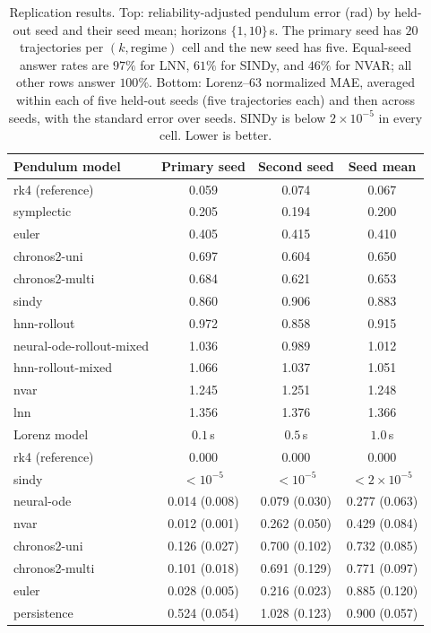 \documentclass{article}
\begin{document}
\begin{table}[htbp]
\centering\small
\caption{Replication results. Top: reliability-adjusted pendulum error (rad) by held-out
seed and their seed mean; horizons $\{1,10\}$\,s. The primary seed has $20$ trajectories per
$(k,\mathrm{regime})$ cell and the new seed has five. Equal-seed answer rates are $97\%$
for LNN, $61\%$ for SINDy, and $46\%$ for NVAR; all other rows answer $100\%$. Bottom:
Lorenz--63 normalized MAE, averaged within each of five held-out seeds (five trajectories each)
and then across seeds, with the standard error over seeds. SINDy is below $2\times10^{-5}$ in
every cell. Lower is better.}
\label{tab:replication}
\begin{tabular}{lccc}
\toprule
Pendulum model & Primary seed & Second seed & Seed mean \\
\midrule
rk4 (reference) & 0.059 & 0.074 & 0.067 \\
symplectic & 0.205 & 0.194 & 0.200 \\
euler & 0.405 & 0.415 & 0.410 \\
chronos2-uni & 0.697 & 0.604 & 0.650 \\
chronos2-multi & 0.684 & 0.621 & 0.653 \\
sindy & 0.860 & 0.906 & 0.883 \\
hnn-rollout & 0.972 & 0.858 & 0.915 \\
neural-ode-rollout-mixed & 1.036 & 0.989 & 1.012 \\
hnn-rollout-mixed & 1.066 & 1.037 & 1.051 \\
nvar & 1.245 & 1.251 & 1.248 \\
lnn & 1.356 & 1.376 & 1.366 \\
\midrule
Lorenz model & $0.1$\,s & $0.5$\,s & $1.0$\,s \\
\midrule
rk4 (reference) & 0.000 & 0.000 & 0.000 \\
sindy & ${<}10^{-5}$ & ${<}10^{-5}$ & ${<}2{\times}10^{-5}$ \\
neural-ode & 0.014 (0.008) & 0.079 (0.030) & 0.277 (0.063) \\
nvar & 0.012 (0.001) & 0.262 (0.050) & 0.429 (0.084) \\
chronos2-uni & 0.126 (0.027) & 0.700 (0.102) & 0.732 (0.085) \\
chronos2-multi & 0.101 (0.018) & 0.691 (0.129) & 0.771 (0.097) \\
euler & 0.028 (0.005) & 0.216 (0.023) & 0.885 (0.120) \\
persistence & 0.524 (0.054) & 1.028 (0.123) & 0.900 (0.057) \\
\bottomrule
\end{tabular}
\end{table}
\end{document}
